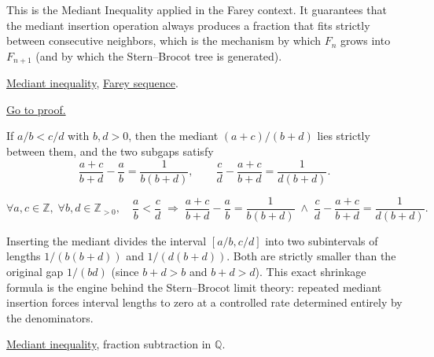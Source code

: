 \begin{remark*}[Interpretation]
This is the Mediant Inequality applied in the Farey context.  It guarantees
that the mediant insertion operation always produces a fraction that fits
strictly between consecutive neighbors, which is the mechanism by which
$F_n$ grows into $F_{n+1}$ (and by which the Stern--Brocot tree is generated).
\end{remark*}

\begin{remark*}[Dependencies]
\hyperref[thm:mediant-inequality]{Mediant inequality},
\hyperref[def:farey-sequence]{Farey sequence}.
\end{remark*}

\begin{remark*}[Proof]
\hyperref[prf:farey-mediant-property]{Go to proof.}
\end{remark*}

\begin{lemma}
\label{lem:mediant-gap}
If $a/b < c/d$ with $b, d > 0$, then the mediant $(a+c)/(b+d)$ lies
strictly between them, and the two subgaps satisfy
\[
\frac{a+c}{b+d} - \frac{a}{b} = \frac{1}{b(b+d)},
\qquad
\frac{c}{d} - \frac{a+c}{b+d} = \frac{1}{d(b+d)}.
\]
\end{lemma}

\begin{remark*}
\[
\forall a,c \in \mathbb{Z},\; \forall b,d \in \mathbb{Z}_{>0},\quad
\frac{a}{b} < \frac{c}{d}
\;\Longrightarrow\;
\frac{a+c}{b+d} - \frac{a}{b} = \frac{1}{b(b+d)}
\;\land\;
\frac{c}{d} - \frac{a+c}{b+d} = \frac{1}{d(b+d)}.
\]
\end{remark*}

\begin{remark*}[Interpretation]
Inserting the mediant divides the interval $[a/b, c/d]$ into two
subintervals of lengths $1/(b(b+d))$ and $1/(d(b+d))$.  Both are
strictly smaller than the original gap $1/(bd)$ (since $b+d > b$ and
$b+d > d$).  This exact shrinkage formula is the engine behind the
Stern--Brocot limit theory: repeated mediant insertion forces interval
lengths to zero at a controlled rate determined entirely by the
denominators.
\end{remark*}

\begin{remark*}[Dependencies]
\hyperref[thm:mediant-inequality]{Mediant inequality},
fraction subtraction in $\mathbb{Q}$.
\end{remark*}


